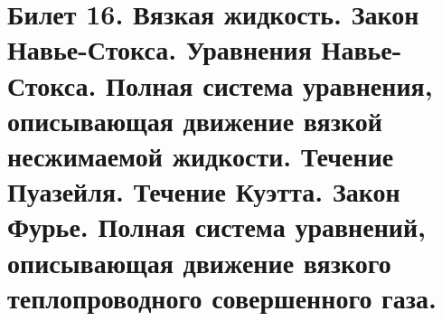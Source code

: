 \newpage
\section{Билет 16. Вязкая жидкость. Закон Навье-Стокса. Уравнения Навье-Стокса. Полная система уравнения, описывающая движение вязкой несжимаемой жидкости. Течение Пуазейля. Течение Куэтта. Закон Фурье. Полная система уравнений, описывающая движение вязкого теплопроводного совершенного газа.}